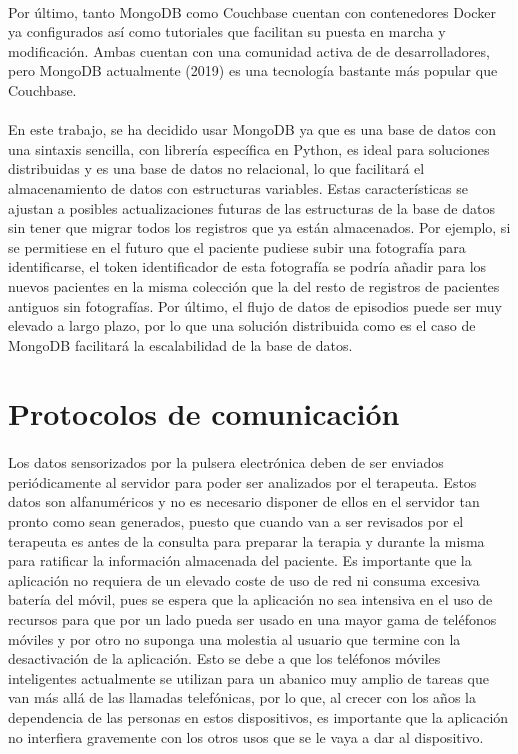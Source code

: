 \begin{itemize}
\paragraph{}
Por último, tanto MongoDB como Couchbase cuentan con contenedores Docker ya configurados así como tutoriales que facilitan su puesta en marcha y modificación. Ambas cuentan con una comunidad activa de de desarrolladores, pero MongoDB actualmente (2019) es una tecnología bastante más popular que Couchbase.
\end{itemize}

\paragraph{}
En este trabajo, se ha decidido usar MongoDB ya que es una base de datos con una sintaxis sencilla, con librería específica en Python, es ideal para soluciones distribuidas y es una base de datos no relacional, lo que facilitará el almacenamiento de datos con estructuras variables. Estas características se ajustan a posibles actualizaciones futuras de las estructuras de la base de datos sin tener que migrar todos los registros que ya están almacenados. Por ejemplo, si se permitiese en el futuro que el paciente pudiese subir una fotografía para identificarse, el token identificador de esta fotografía se podría añadir para los nuevos pacientes en la misma colección que la del resto de registros de pacientes antiguos sin fotografías. Por último, el flujo de datos de episodios puede ser muy elevado a largo plazo, por lo que una solución distribuida como es el caso de MongoDB facilitará la escalabilidad de la base de datos.

\section{Protocolos de comunicación}
\label{sec:protoCom}
\paragraph{}
Los datos sensorizados por la pulsera electrónica deben de ser enviados periódicamente al servidor para poder ser analizados por el terapeuta. Estos datos son alfanuméricos y no es necesario disponer de ellos en el servidor tan pronto como sean generados, puesto que cuando van a ser revisados por el terapeuta es antes de la consulta para preparar la terapia y durante la misma para ratificar la información almacenada del paciente. Es importante que la aplicación no requiera de un elevado coste de uso de red ni consuma excesiva batería del móvil, pues se espera que la aplicación no sea intensiva en el uso de recursos para que por un lado pueda ser usado en una mayor gama de teléfonos móviles y por otro no suponga una molestia al usuario que termine con la desactivación de la aplicación. Esto se debe a que los teléfonos móviles inteligentes actualmente se utilizan para un abanico muy amplio de tareas que van más allá de las llamadas telefónicas, por lo que, al crecer con los años la dependencia de las personas en estos dispositivos, es importante que la aplicación no interfiera gravemente con los otros usos que se le vaya a dar al dispositivo.

